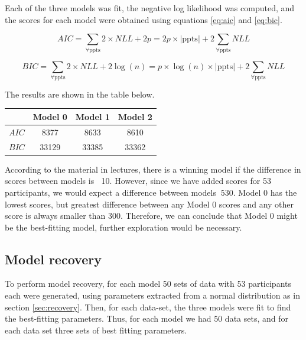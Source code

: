 \documentclass[12pt]{article}
\begin{document}
Each of the three models was fit, the negative log likelihood was computed, and the scores for each model were obtained using equations \ref{eq:aic} and \ref{eq:bic}.

\begin{equation}
\label{eq:aic}
AIC = \sum_{\forall \mathrm{ppts}} 2 \times NLL + 2 p = 2 p \times |\mathrm{ppts}|  + 2 \sum_\mathrm{\forall \mathrm{ppts}} NLL
\end{equation}

\begin{equation}
BIC = \sum_{\forall \mathrm{ppts}} 2 \times NLL + 2 \log(n) =  p \times \log(n) \times |\mathrm{ppts}|  + 2 \sum_\mathrm{\forall \mathrm{ppts}} NLL
\label{eq:bic}
\end{equation}

The results are shown in the table below.


\begin{center}
 \begin{tabular}{|c || c | c | c |} 
 \hline
  & Model 0 & Model 1 & Model 2  \\ [0.5ex] 
 \hline\hline
 $AIC$ & 8377 & 8633 & 8610 \\
 \hline
 $BIC$ & 33129 & 33385 & 33362 \\ [1ex] 
 \hline
\end{tabular}
\end{center}

According to the material in lectures, there is a winning model if the difference in scores between models is $\>$ 10. However, since we have added scores for 53 participants, we would expect a difference between models $\> 530$. Model 0 has the lowest scores, but greatest difference between any Model 0 scores and any other score is always smaller than 300. Therefore, we can conclude that Model 0 might be the best-fitting model, further exploration would be necessary.

\subsection{Model recovery}

To perform model recovery, for each model 50 sets of data with 53 participants each were generated, using parameters extracted from a normal distribution as in section \ref{sec:recovery}. Then, for each data-set, the three models were fit to find the best-fitting parameters. Thus, for each model we had 50 data sets, and for each data set three sets of best fitting parameters.
\end{document}
